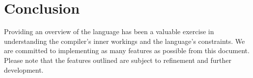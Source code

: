 \documentclass{article}
\begin{document}
\section{Conclusion}
Providing an overview of the language has been a valuable exercise in understanding the compiler's inner workings and the language's constraints. We are committed to implementing as many features as possible from this document. Please note that the features outlined are subject to refinement and further development.
\end{document}
